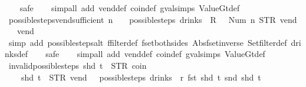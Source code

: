 \begin{isabellebody}
\ \ \isamarkupfalse%
\ safe\isanewline
\ \ \isamarkupfalse%
\ {\isacharparenleft}simp{\isacharunderscore}all\ add{\isacharcolon}\ vend{\isacharunderscore}def\ coin{\isacharunderscore}def\ gval{\isachardot}simps\ ValueGt{\isacharunderscore}def{\isacharparenright}%
\endisatagproof
{\isafoldproof}%
%
\isadelimproof
\isanewline
%
\endisadelimproof
\isanewline
{}\isamarkupfalse%
\ possible{\isacharunderscore}steps{\isacharunderscore}vend{\isacharunderscore}sufficient{\isacharcolon}\ {\isachardoublequoteopen}n\ {\isachargreater}\ {}\ {\isasymLongrightarrow}\ possible{\isacharunderscore}steps\ drinks\ {}\ {\isacharless}R\ {}\ {\isacharcolon}{\isacharequal}\ Num\ n{\isachargreater}\ STR\ {\isacharprime}{\isacharprime}vend{\isacharprime}{\isacharprime}\ {\isacharbrackleft}{\isacharbrackright}\ {\isacharequal}\ {\isacharbraceleft}{\isacharbar}{\isacharparenleft}{}{\isacharcomma}\ vend{\isacharparenright}{\isacharbar}{\isacharbraceright}{\isachardoublequoteclose}\isanewline
%
\isadelimproof
\ \ %
\endisadelimproof
%
\isatagproof
{}\isamarkupfalse%
\ {\isacharparenleft}simp\ add{\isacharcolon}\ possible{\isacharunderscore}steps{\isacharunderscore}alt\ ffilter{\isacharunderscore}def\ fset{\isacharunderscore}both{\isacharunderscore}sides\ Abs{\isacharunderscore}fset{\isacharunderscore}inverse\ Set{\isachardot}filter{\isacharunderscore}def\ drinks{\isacharunderscore}def{\isacharparenright}\isanewline
\ \ \isamarkupfalse%
\ safe\isanewline
\ \ \isamarkupfalse%
\ {\isacharparenleft}simp{\isacharunderscore}all\ add{\isacharcolon}\ vend{\isacharunderscore}def\ coin{\isacharunderscore}def\ gval{\isachardot}simps\ ValueGt{\isacharunderscore}def{\isacharparenright}%
\endisatagproof
{\isafoldproof}%
%
\isadelimproof
\isanewline
%
\endisadelimproof
\isanewline
{}\isamarkupfalse%
\ invalid{\isacharunderscore}possible{\isacharunderscore}steps{\isacharunderscore}{}{\isacharcolon}\ {\isachardoublequoteopen}shd\ t\ {\isasymnoteq}\ {\isacharparenleft}STR\ {\isacharprime}{\isacharprime}coin{\isacharprime}{\isacharprime}{\isacharcomma}\ {\isacharbrackleft}{\isacharbrackright}{\isacharparenright}\ {\isasymLongrightarrow}\isanewline
\ \ \ \ shd\ t\ {\isasymnoteq}\ {\isacharparenleft}STR\ {\isacharprime}{\isacharprime}vend{\isacharprime}{\isacharprime}{\isacharcomma}\ {\isacharbrackleft}{\isacharbrackright}{\isacharparenright}\ {\isasymLongrightarrow}\ possible{\isacharunderscore}steps\ drinks\ {}\ r\ {\isacharparenleft}fst\ {\isacharparenleft}shd\ t{\isacharparenright}{\isacharparenright}\ {\isacharparenleft}snd\ {\isacharparenleft}shd\ t{\isacharparenright}{\isacharparenright}\ {\isacharequal}\ {\isacharbraceleft}{\isacharbar}{\isacharbar}{\isacharbraceright}{\isachardoublequoteclose}\isanewline

\end{isabellebody}
